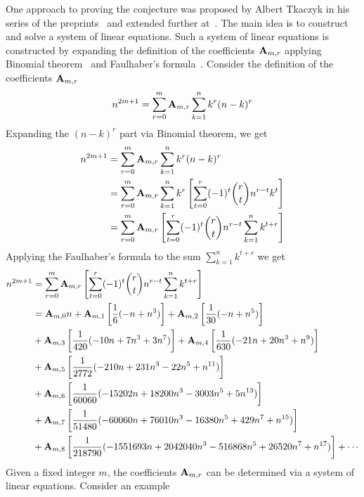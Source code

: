 One approach to proving the conjecture was proposed by Albert Tkaczyk
in his series of the preprints~\cite{tkaczyk2018problem, tkaczyk2018continuation}
and extended further at~\cite{unusual_identity_for_odd_powers}.
The main idea is to construct and solve a system of linear equations.
Such a system of linear equations is constructed
by expanding the definition of the coefficients ${\mathbf{A}} \sb{m,r}$
applying Binomial theorem~\cite{abramowitz1988handbook} and Faulhaber's formula~\cite{beardon1996sums}.
Consider the definition of the coefficients ${\mathbf{A}} \sb{m,r}$
\begin{equation}
    n^{2m+1} = \sum_{r=0}^{m} {\mathbf{A}} \sb{m,r} \sum_{k=1}^{n} k^{r} (n-k)^{r}\label{eq:odd-power-identity}
\end{equation}
Expanding the $(n-k)^r$ part via Binomial theorem, we get
\begin{equation*}
    \begin{split}
        n^{2m+1} &= \sum_{r=0}^{m} {\mathbf{A}} \sb{m,r} \sum_{k=1}^{n} k^{r} (n-k)^{r} \\
        &= \sum_{r=0}^{m} {\mathbf{A}} \sb{m,r} \sum_{k=1}^{n} k^{r} \left[ \sum_{t=0}^{r} (-1)^t \binom{r}{t} n^{r-t} k^{t} \right] \\
        &= \sum_{r=0}^{m} {\mathbf{A}} \sb{m,r} \left[ \sum_{t=0}^{r} (-1)^t \binom{r}{t} n^{r-t} \sum_{k=1}^{n} k^{t+r} \right] \\
    \end{split}
\end{equation*}
Applying the Faulhaber's formula to the sum $\sum_{k=1}^{n} k^{t+r}$ we get
\begin{equation}
    \begin{split}
        n^{2m+1}
        &= \sum_{r=0}^{m} {\mathbf{A}} \sb{m,r} \left[ \sum_{t=0}^{r} (-1)^t \binom{r}{t} n^{r-t} \sum_{k=1}^{n} k^{t+r} \right] \\
        &= {\mathbf{A}} \sb{m,0} n  + {\mathbf{A}} \sb{m,1} \left[ \frac{1}{6} (-n + n^3) \right] + {\mathbf{A}} \sb{m,2} \left[ \frac{1}{30} (-n + n^5) \right] \\
        &+ {\mathbf{A}} \sb{m,3} \left[ \frac{1}{420} (-10 n + 7 n^3 + 3 n^7) \right] + {\mathbf{A}} \sb{m,4} \left[ \frac{1}{630} (-21 n + 20 n^3 + n^9) \right] \\
        &+ {\mathbf{A}} \sb{m,5} \left[ \frac{1}{2772} (-210 n + 231 n^3 - 22 n^5 + n^{11}) \right] \\
        &+ {\mathbf{A}} \sb{m,6} \left[ \frac{1}{60060} (-15202 n + 18200 n^3 - 3003 n^5 + 5 n^{13}) \right] \\
        &+ {\mathbf{A}} \sb{m,7} \left[ \frac{1}{51480} (-60060 n + 76010 n^3 - 16380 n^5 + 429 n^7 + n^{15}) \right] \\
        &+ {\mathbf{A}} \sb{m,8} \left[ \frac{1}{218790} (-1551693 n + 2042040 n^3 - 516868 n^5 + 26520 n^7 + n^{17}) \right] + \cdots
    \end{split}\label{eq:arbitrary-relation}
\end{equation}
Given a fixed integer $m$, the coefficients ${\mathbf{A}} \sb{m,r}$ can be determined via a system of linear equations.
Consider an example
